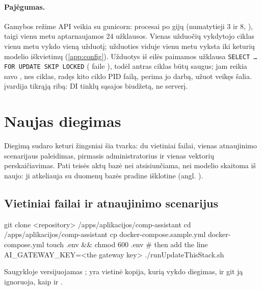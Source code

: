 \paragraph{Pajėgumas.} Gamybos režime API veikia su gunicorn:  procesai
po  gijų (numatytieji 3 ir 8, ), taigi vienu
metu aptarnaujamos 24 užklausos. Vienas užduočių vykdytojo ciklas vienu metu vykdo vieną užduotį;
užduoties viduje vienu metu vyksta iki keturių modelio iškvietimų (\cref{app:config}). Užduotys iš
eilės paimamos užklausa \texttt{SELECT … FOR UPDATE SKIP LOCKED} ( faile
), todėl antras ciklas būtų saugus; jam reikia savo ,
nes ciklas, radęs kito ciklo PID failą, perima jo darbą, užuot veikęs šalia.
 įvardija tikrąją ribą: DI tinklų sąsajos biudžetą, ne serverį.


\section{Naujas diegimas}\label{sec:ops:install}

Diegimą sudaro keturi žingsniai šia tvarka: du vietiniai failai, vienas atnaujinimo scenarijaus
paleidimas, pirmasis administratorius ir vienas vektorių perskaičiavimas. Pati teisės aktų bazė
nei atsisiunčiama, nei modelio skaitoma iš naujo: ji atkeliauja su duomenų bazės pradine
išklotine (angl. ).

\subsection{Vietiniai failai ir atnaujinimo scenarijus}

\begin{codeblock}
git clone <repository> /apps/aplikacijos/comp-assistant
cd /apps/aplikacijos/comp-assistant
cp docker-compose.sample.yml docker-compose.yml
touch .env && chmod 600 .env      # then add the line  AI_GATEWAY_KEY=<the gateway key>
./runUpdateThisStack.sh
\end{codeblock}

Saugykloje versijuojamas ;  yra vietinė
kopija, kurią vykdo diegimas, ir git ją ignoruoja, kaip ir .

